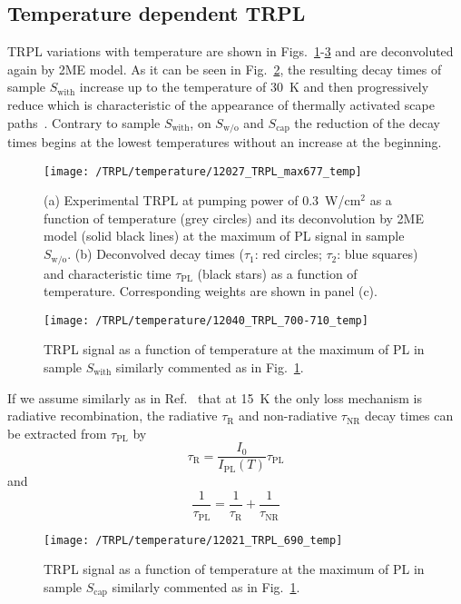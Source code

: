 \newpage
\subsection{Temperature dependent TRPL}
TRPL variations with temperature are shown in Figs.~\ref{fig:TRPL_temp_wo}-\ref{fig:TRPL_temp_c} and are deconvoluted again by 2ME model. As it can be seen in Fig.~\ref{fig:TRPL_temp_w}, the resulting decay times of sample $S_\mathrm{with}$ increase up to the temperature of 30~K and then progressively reduce which is characteristic of the appearance of thermally activated scape paths~\citep{Manna_apl2012_TRPLtype2}. Contrary to sample $S_\mathrm{with}$, on $S_\mathrm{w/o}$ and $S_\mathrm{cap}$ the reduction of the decay times begins at the lowest temperatures without an increase at the beginning.
%
\begin{figure}
	\centering
	\texttt{[image: /TRPL/temperature/12027\_TRPL\_max677\_temp]}
	\caption{(a) Experimental TRPL at pumping power of 0.3~W/cm$^2$ as a function of temperature (grey circles) and its deconvolution by 2ME model (solid black lines) at the maximum of PL signal in sample $S_\mathrm{w/o}$. (b) Deconvolved decay times ($\tau_1$: red circles; $\tau_2$: blue squares) and characteristic time $\tau_\mathrm{PL}$ (black stars) as a function of temperature. Corresponding weights are shown in panel (c).}
	\label{fig:TRPL_temp_wo}
\end{figure}
%
\begin{figure}
	\centering
	\texttt{[image: /TRPL/temperature/12040\_TRPL\_700-710\_temp]}
	\caption{TRPL signal as a function of temperature at the maximum of PL in sample $S_\mathrm{with}$ similarly commented as in Fig.~\ref{fig:TRPL_temp_wo}.}
	\label{fig:TRPL_temp_w}
\end{figure}
%

If we assume similarly as in Ref.~\citep{t_alvarez} that at 15~K the only loss mechanism is radiative recombination, the radiative $\tau_\mathrm{R}$ and non-radiative $\tau_\mathrm{NR}$ decay times can be extracted from $\tau_\mathrm{PL}$ by
%
\begin{equation}
\tau_\mathrm{R}=\frac{I_0}{I_\mathrm{PL}(T)}\tau_\mathrm{PL} \label{eq:tau_R_fromPL}
\end{equation}
and
\begin{equation}
\frac{1}{\tau_\mathrm{PL}}=\frac{1}{\tau_\mathrm{R}} + \frac{1}{\tau_\mathrm{NR}}
\end{equation}
%
\begin{figure}
	\centering
	\texttt{[image: /TRPL/temperature/12021\_TRPL\_690\_temp]}
	\caption{TRPL signal as a function of temperature at the maximum of PL in sample $S_\mathrm{cap}$ similarly commented as in Fig.~\ref{fig:TRPL_temp_wo}.}
	\label{fig:TRPL_temp_c}
\end{figure}
%

